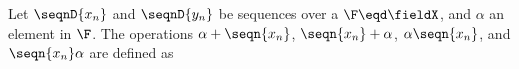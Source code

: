 
\begin{definition}
\label{def:axn}
Let $\seqnD{x_n}$ and $\seqnD{y_n}$ be sequences over a  $\F\eqd\fieldX$, and $\alpha$ an element in $\F$.
The operations $\alpha+\seqn{x_n}$, $\seqn{x_n}+\alpha$, 
               $\alpha\seqn{x_n}$, and $\seqn{x_n}\alpha$ are defined as
\end{definition}



